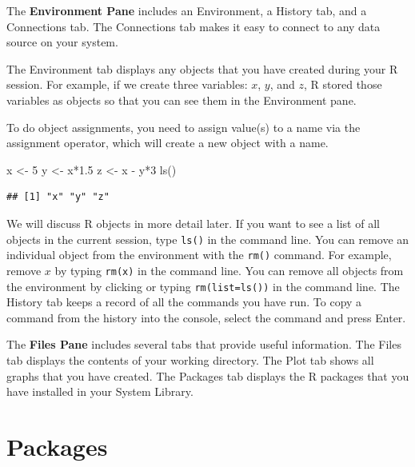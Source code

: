 \documentclass[
]{book}
\newenvironment{Shaded}{\begin{snugshade}}{\end{snugshade}}
\newcommand{\DecValTok}[1]{\textcolor[rgb]{0.00,0.00,0.81}{#1}}
\newcommand{\FloatTok}[1]{\textcolor[rgb]{0.00,0.00,0.81}{#1}}
\newcommand{\FunctionTok}[1]{\textcolor[rgb]{0.00,0.00,0.00}{#1}}
\newcommand{\NormalTok}[1]{#1}
\newcommand{\OtherTok}[1]{\textcolor[rgb]{0.56,0.35,0.01}{#1}}
\newcommand{\SpecialCharTok}[1]{\textcolor[rgb]{0.00,0.00,0.00}{#1}}
\theoremstyle{definition}
\theoremstyle{definition}
\theoremstyle{definition}
\theoremstyle{definition}
\theoremstyle{remark}
\begin{document}
The \textbf{Environment Pane} includes an Environment, a History tab, and a Connections tab. The Connections tab makes it easy to connect to any data source on your system.

The Environment tab displays any objects that you have created during your R session. For example, if we create three variables: \(x\), \(y\), and \(z\), R stored those variables as objects so that you can see them in the Environment pane.

To do object assignments, you need to assign value(s) to a name via the assignment operator, which will create a new object with a name.

\begin{Shaded}
\begin{Highlighting}[]
\NormalTok{x }\OtherTok{\textless{}{-}} \DecValTok{5}
\NormalTok{y }\OtherTok{\textless{}{-}}\NormalTok{ x}\SpecialCharTok{*}\FloatTok{1.5}
\NormalTok{z }\OtherTok{\textless{}{-}}\NormalTok{ x }\SpecialCharTok{{-}}\NormalTok{ y}\SpecialCharTok{*}\DecValTok{3}
\FunctionTok{ls}\NormalTok{()}
\end{Highlighting}
\end{Shaded}

\begin{verbatim}
## [1] "x" "y" "z"
\end{verbatim}

We will discuss R objects in more detail later. If you want to see a list of all objects in the current session, type \texttt{ls()} in the command line. You can remove an individual object from the environment with the \texttt{rm()} command. For example, remove \(x\) by typing \texttt{rm(x)} in the command line. You can remove all objects from the environment by clicking or typing \texttt{rm(list=ls())} in the command line. The History tab keeps a record of all the commands you have run. To copy a command from the history into the console, select the command and press Enter.

The \textbf{Files Pane} includes several tabs that provide useful information. The Files tab displays the contents of your working directory. The Plot tab shows all graphs that you have created. The Packages tab displays the R packages that you have installed in your System Library.

\hypertarget{packages}{%
\section{Packages}\label{packages}}
\end{document}

